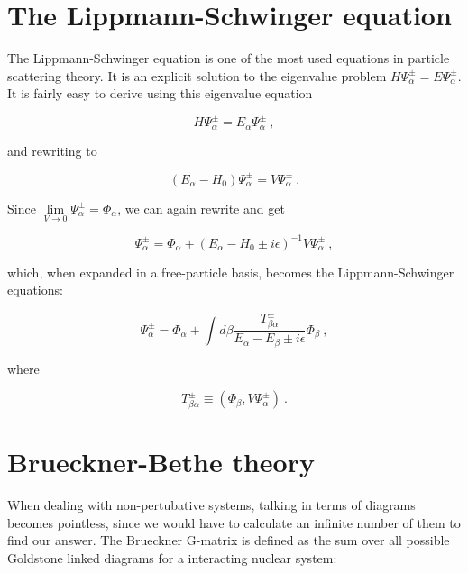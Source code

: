 \documentclass[10pt,twoside]{report}
\begin{document}
	\section{The Lippmann-Schwinger equation}
	The Lippmann-Schwinger equation is one of the most used equations in particle scattering theory. It is an explicit solution to the eigenvalue problem $H\Psi_\alpha^\pm = E\Psi_\alpha^\pm$. It is fairly easy \cite{Weinberg95} to derive using this eigenvalue equation
	
	\begin{equation}
		H\Psi_\alpha^\pm = E_\alpha\Psi_\alpha^\pm \:,
	\end{equation}
	
	\noindent and rewriting to
	
	\begin{equation}
		(E_\alpha - H_0)\Psi_\alpha^\pm = V\Psi_\alpha^\pm\:.
	\end{equation}
	
	Since $\lim\limits_{V\rightarrow0} \Psi_\alpha^\pm = \Phi_\alpha$, we can again rewrite and get
	
	\begin{equation}
		\Psi_\alpha^\pm = \Phi_\alpha + (E_\alpha - H_0 \pm i\epsilon)^{-1}V\Psi_\alpha^\pm \:,
	\end{equation}
		
	\noindent which, when expanded in a free-particle basis, becomes the Lippmann-Schwinger equations:
	
	\begin{equation}
		\Psi_\alpha^\pm = \Phi_\alpha + \int d\beta \frac{T_{\beta\alpha}^\pm}{E_\alpha - E_\beta \pm i\epsilon}\Phi_\beta \:,
	\end{equation}
	
	\noindent where
	
	\begin{equation}
		T_{\beta\alpha}^\pm \equiv \left(\Phi_\beta,V\Psi_\alpha^\pm\right) \:.
	\end{equation}
		
	\section{Brueckner-Bethe theory}
	When dealing with non-pertubative systems, talking in terms of diagrams becomes pointless, since we would have to calculate an infinite number of them to find our answer.
	The Brueckner G-matrix \cite{HJensenKuoOsnes95} is defined as the sum over all possible Goldstone linked diagrams for a interacting nuclear system:
	
\end{document}

